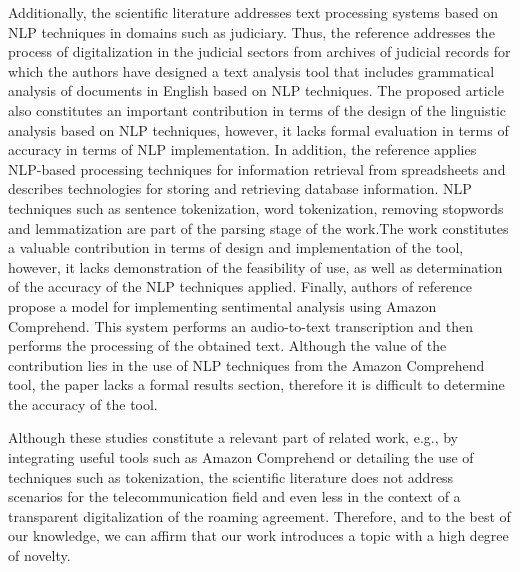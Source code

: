 Additionally, the scientific literature addresses text processing systems based on NLP techniques in domains such as judiciary. Thus, the reference \cite{8487847} addresses the process of digitalization in the judicial sectors from archives of judicial records for which the authors have designed a text analysis tool that includes grammatical analysis of documents in English based on NLP techniques. The proposed article also constitutes an important contribution in terms of the design of the linguistic analysis based on NLP techniques, however, it lacks formal evaluation in terms of accuracy in terms of NLP implementation. In addition, the reference \cite{9138070} applies NLP-based processing techniques for information retrieval from spreadsheets and describes technologies for storing and retrieving database information. NLP techniques such as sentence tokenization, word tokenization, removing stopwords and lemmatization are part of the parsing stage of the work.The work constitutes a valuable contribution in terms of design and implementation of the tool, however, it lacks demonstration of the feasibility of use, as well as determination of the accuracy of the NLP techniques applied. Finally, authors of reference \cite{9104105} propose a model for implementing sentimental analysis using Amazon Comprehend. This system performs an audio-to-text transcription and then performs the processing of the obtained text. Although the value of the contribution lies in the use of NLP techniques from the Amazon Comprehend tool, the paper lacks a formal results section, therefore it is difficult to determine the accuracy of the tool. 

Although these studies constitute a relevant part of related work, e.g., by integrating useful tools such as Amazon Comprehend or detailing the use of techniques such as tokenization, the scientific literature does not address scenarios for the telecommunication field and even less in the context of a transparent digitalization of the roaming agreement. Therefore, and to the best of our knowledge, we can affirm that our work introduces a topic with a high degree of novelty.
